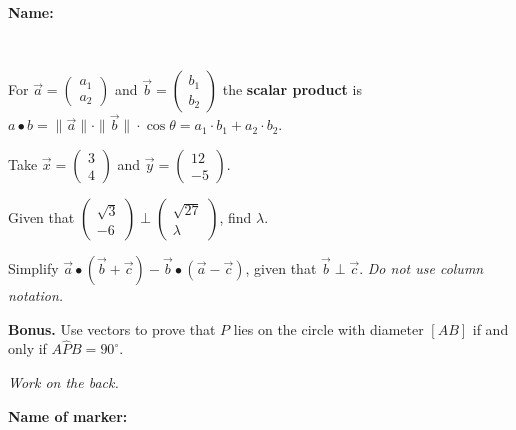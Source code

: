 \documentclass[9pt]{exam}
\begin{document}
\textbf{Name:} \dotfill

\

For $\overrightarrow{a} = \left(\begin{matrix} a_1 \\ a_2 \end{matrix} \right)$ and $\overrightarrow{b} = \left(\begin{matrix} b_1 \\ b_2 \end{matrix} \right)$ the \textbf{scalar product} is $ a \bullet b = \| \overrightarrow{a} \| \cdot \| \overrightarrow{b} \| \cdot \cos \theta = a_1 \cdot b_1 + a_2 \cdot b_2$.

\begin{questions} 
\question Take $\overrightarrow{x} = \left(\begin{matrix} 3 \\ 4 \end{matrix} \right)$ and $\overrightarrow{y} = \left(\begin{matrix} 12 \\ -5 \end{matrix} \right)$.

\question[4] Given that $\left(\begin{matrix} \sqrt{3} \\ -6 \end{matrix} \right) \perp \left(\begin{matrix} \sqrt{27} \\ \lambda \end{matrix} \right)$, find $\lambda$.
\fillwithdottedlines{3cm}

\question[3] Simplify $\overrightarrow{a} \bullet (\overrightarrow{b} + \overrightarrow{c}) -  \overrightarrow{b} \bullet (\overrightarrow{a} -\overrightarrow{c})$, given that $\overrightarrow{b} \perp \overrightarrow{c}$.
\hfill \emph{Do not use column notation.}
\fillwithdottedlines{4cm}

\vfill

\question[0] \textbf{Bonus.} 
Use vectors to prove that $P$ lies on the circle with diameter $[AB]$ if and only if $A\hat{P}B = 90^\circ$.

\hfill \emph{Work on the back.}

\end{questions}


\begin{tcolorbox}

\textbf{Name of marker:}

\begin{center}
\gradetable[h][questions]
\end{center}

\end{tcolorbox}
\end{document}
